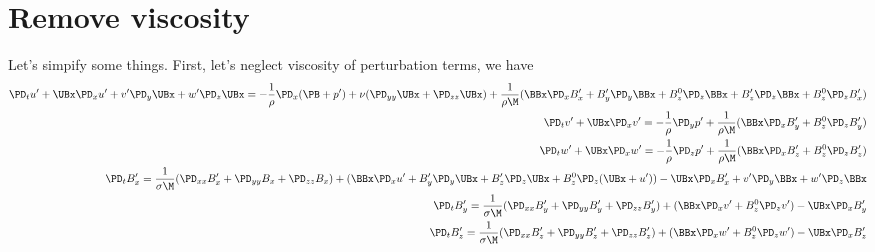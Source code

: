 \documentclass[11pt]{article}
\begin{document}
\section{Remove viscosity}
Let's simpify some things. First, let's neglect viscosity of perturbation terms, we have
\tiny\begin{equation}\begin{aligned}
\PD_t u'+ \UBx\PD_x u' + v'\PD_y \UBx  + w'\PD_z \UBx = -\frac{1}{\rho}\PD_x (\PB + p') + \nu (\PD_{yy} \UBx +\PD_{zz} \UBx ) + \frac{1}{\rho \M} (\BBx \PD_x B_x' + B_y' \PD_y \BBx + B_z^0 \PD_z \BBx + B_z' \PD_z \BBx + B_z^0 \PD_z B_x' ) \\
\PD_t v'+ \UBx\PD_x v'                                = -\frac{1}{\rho}\PD_y p' + \frac{1}{\rho \M} (\BBx \PD_x B_y'                   +  B_z^0  \PD_z B_y') \\
\PD_t w'+ \UBx\PD_x w'                                = -\frac{1}{\rho}\PD_z p' + \frac{1}{\rho \M} (\BBx \PD_x B_z'                   +  B_z^0  \PD_z B_z') \\
\PD_t B_x' = \frac{1}{\sigma \M} (\PD_{xx} B_x' + \PD_{yy} B_x +\PD_{zz} B_x ) + (\BBx \PD_x u'+B_y'\PD_y \UBx +B_z'\PD_z \UBx +B_z^0 \PD_z (\UBx+u') ) - \UBx\PD_x B_x'+v'\PD_y \BBx +w'\PD_z \BBx \\
\PD_t B_y' = \frac{1}{\sigma \M} (\PD_{xx} B_y' + \PD_{yy} B_y'+\PD_{zz} B_y') + (\BBx \PD_x v'                +                B_z^0 \PD_z v')         - \UBx\PD_x B_y'                            \\
\PD_t B_z' = \frac{1}{\sigma \M} (\PD_{xx} B_z' + \PD_{yy} B_z'+\PD_{zz} B_z') + (\BBx \PD_x w'                +                B_z^0 \PD_z w')         - \UBx\PD_x B_z'                            \\
\end{aligned} \end{equation}\normalsize
\end{document}
